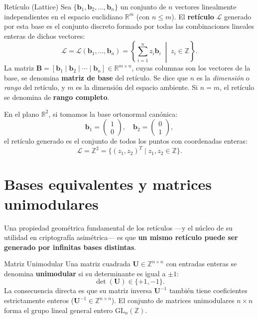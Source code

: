 \documentclass[11pt,a4paper,twoside,openright]{book}
\theoremstyle{plain}
\theoremstyle{definition}
\theoremstyle{remark}
\newcommand{\Z}{\mathbb{Z}}
\newcommand{\R}{\mathbb{R}}
\newcommand{\vv}[1]{\mathbf{#1}}
\newcommand{\mm}[1]{\mathbf{#1}}
\begin{document}
\begin{midef}{Ret\'iculo (Lattice)}
Sea $\{\vv{b}_1, \vv{b}_2, \ldots, \vv{b}_n\}$ un conjunto de $n$ vectores linealmente independientes en el espacio euclidiano $\R^m$ (con $n \leq m$). El \textbf{ret\'iculo} $\mathcal{L}$ generado por esta base es el conjunto discreto formado por todas las combinaciones lineales enteras de dichos vectores:
\[
  \mathcal{L} = \mathcal{L}(\vv{b}_1, \ldots, \vv{b}_n) = \left\{ \sum_{i=1}^n z_i \vv{b}_i \;\middle|\; z_i \in \Z \right\}.
\]
La matriz $\mm{B} = [\vv{b}_1 \mid \vv{b}_2 \mid \cdots \mid \vv{b}_n] \in \R^{m \times n}$, cuyas columnas son los vectores de la base, se denomina \textbf{matriz de base} del ret\'iculo. Se dice que $n$ es la \emph{dimensi\'on} o \emph{rango} del ret\'iculo, y $m$ es la dimensi\'on del espacio ambiente. Si $n = m$, el ret\'iculo se denomina de \textbf{rango completo}.
\end{midef}

\begin{ejemplopaso}[El ret\'iculo entero can\'onico $\Z^2$]
En el plano $\R^2$, si tomamos la base ortonormal can\'onica:
\[
  \vv{b}_1 = \begin{pmatrix} 1 \\ 0 \end{pmatrix}, \quad \vv{b}_2 = \begin{pmatrix} 0 \\ 1 \end{pmatrix},
\]
el ret\'iculo generado es el conjunto de todos los puntos con coordenadas enteras:
\[
  \mathcal{L} = \Z^2 = \{ (z_1, z_2)^T \mid z_1, z_2 \in \Z \}.
\]
\end{ejemplopaso}

\section{Bases equivalentes y matrices unimodulares}

Una propiedad geom\'etrica fundamental de los ret\'iculos ---y el n\'ucleo de su utilidad en criptograf\'ia asim\'etrica--- es que \textbf{un mismo ret\'iculo puede ser generado por infinitas bases distintas}.

\begin{midef}{Matriz Unimodular}
Una matriz cuadrada $\mm{U} \in \Z^{n \times n}$ con entradas enteras se denomina \textbf{unimodular} si su determinante es igual a $\pm 1$:
\[
  \det(\mm{U}) \in \{+1, -1\}.
\]
La consecuencia directa es que su matriz inversa $\mm{U}^{-1}$ tambi\'en tiene coeficientes estrictamente enteros ($\mm{U}^{-1} \in \Z^{n \times n}$). El conjunto de matrices unimodulares $n \times n$ forma el grupo lineal general entero $\mathrm{GL}_n(\Z)$.
\end{midef}
\end{document}

